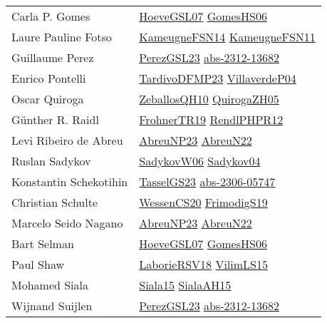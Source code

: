 {\begin{longtable}{p{4cm}p{20cm}}
Carla P. Gomes & \href{papers/HoeveGSL07.pdf}{HoeveGSL07}\cite{HoeveGSL07} \href{papers/GomesHS06.pdf}{GomesHS06}\cite{GomesHS06} \\
Laure Pauline Fotso & \href{articles/KameugneFSN14.pdf}{KameugneFSN14}\cite{KameugneFSN14} \href{papers/KameugneFSN11.pdf}{KameugneFSN11}\cite{KameugneFSN11} \\
Guillaume Perez & \href{papers/PerezGSL23.pdf}{PerezGSL23}\cite{PerezGSL23} \href{articles/abs-2312-13682.pdf}{abs-2312-13682}\cite{abs-2312-13682} \\
Enrico Pontelli & \href{papers/TardivoDFMP23.pdf}{TardivoDFMP23}\cite{TardivoDFMP23} \href{}{VillaverdeP04}\cite{VillaverdeP04} \\
Oscar Quiroga & \href{articles/ZeballosQH10.pdf}{ZeballosQH10}\cite{ZeballosQH10} \href{papers/QuirogaZH05.pdf}{QuirogaZH05}\cite{QuirogaZH05} \\
G{\"{u}}nther R. Raidl & \href{papers/FrohnerTR19.pdf}{FrohnerTR19}\cite{FrohnerTR19} \href{papers/RendlPHPR12.pdf}{RendlPHPR12}\cite{RendlPHPR12} \\
Levi Ribeiro de Abreu & \href{}{AbreuNP23}\cite{AbreuNP23} \href{articles/AbreuN22.pdf}{AbreuN22}\cite{AbreuN22} \\
Ruslan Sadykov & \href{}{SadykovW06}\cite{SadykovW06} \href{papers/Sadykov04.pdf}{Sadykov04}\cite{Sadykov04} \\
Konstantin Schekotihin & \href{papers/TasselGS23.pdf}{TasselGS23}\cite{TasselGS23} \href{articles/abs-2306-05747.pdf}{abs-2306-05747}\cite{abs-2306-05747} \\
Christian Schulte & \href{papers/WessenCS20.pdf}{WessenCS20}\cite{WessenCS20} \href{papers/FrimodigS19.pdf}{FrimodigS19}\cite{FrimodigS19} \\
Marcelo Seido Nagano & \href{}{AbreuNP23}\cite{AbreuNP23} \href{articles/AbreuN22.pdf}{AbreuN22}\cite{AbreuN22} \\
Bart Selman & \href{papers/HoeveGSL07.pdf}{HoeveGSL07}\cite{HoeveGSL07} \href{papers/GomesHS06.pdf}{GomesHS06}\cite{GomesHS06} \\
Paul Shaw & \href{articles/LaborieRSV18.pdf}{LaborieRSV18}\cite{LaborieRSV18} \href{papers/VilimLS15.pdf}{VilimLS15}\cite{VilimLS15} \\
Mohamed Siala & \href{articles/Siala15.pdf}{Siala15}\cite{Siala15} \href{papers/SialaAH15.pdf}{SialaAH15}\cite{SialaAH15} \\
Wijnand Suijlen & \href{papers/PerezGSL23.pdf}{PerezGSL23}\cite{PerezGSL23} \href{articles/abs-2312-13682.pdf}{abs-2312-13682}\cite{abs-2312-13682} \\

\end{longtable}}
